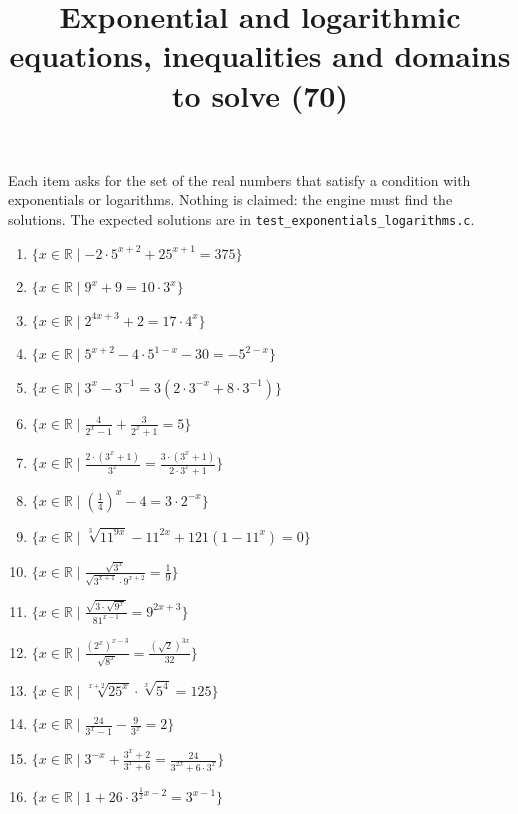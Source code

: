 \documentclass[11pt,a4paper]{article}
\title{Exponential and logarithmic equations, inequalities and domains to solve (70)}
\author{}
\date{}
\begin{document}
\maketitle
Each item asks for the set of the real numbers that satisfy a condition with exponentials or logarithms. Nothing is claimed: the engine must find the solutions. The expected solutions are in \texttt{test\_exponentials\_logarithms.c}.

\begin{enumerate}
\item $\displaystyle \{x \in \mathbb{R} \mid -2 \cdot 5^{x+2} + 25^{x+1} = 375\}$
\item $\displaystyle \{x \in \mathbb{R} \mid 9^{x} + 9 = 10 \cdot 3^{x}\}$
\item $\displaystyle \{x \in \mathbb{R} \mid 2^{4x+3} + 2 = 17 \cdot 4^{x}\}$
\item $\displaystyle \{x \in \mathbb{R} \mid 5^{x+2} - 4 \cdot 5^{1-x} - 30 = -5^{2-x}\}$
\item $\displaystyle \{x \in \mathbb{R} \mid 3^{x} - 3^{-1} = 3(2 \cdot 3^{-x} + 8 \cdot 3^{-1})\}$
\item $\displaystyle \{x \in \mathbb{R} \mid \frac{4}{2^{x} - 1} + \frac{3}{2^{x} + 1} = 5\}$
\item $\displaystyle \{x \in \mathbb{R} \mid \frac{2 \cdot (3^{x} + 1)}{3^{x}} = \frac{3 \cdot (3^{x} + 1)}{2 \cdot 3^{x} + 1}\}$
\item $\displaystyle \{x \in \mathbb{R} \mid \left(\frac{1}{4}\right)^{x} - 4 = 3 \cdot 2^{-x}\}$
\item $\displaystyle \{x \in \mathbb{R} \mid \sqrt[3]{11^{9x}} - 11^{2x} + 121(1 - 11^{x}) = 0\}$
\item $\displaystyle \{x \in \mathbb{R} \mid \frac{\sqrt{3^{x}}}{\sqrt{3^{x+1}} \cdot 9^{x+2}} = \frac{1}{9}\}$
\item $\displaystyle \{x \in \mathbb{R} \mid \frac{\sqrt{3 \cdot \sqrt{9^{x}}}}{81^{x-1}} = 9^{2x+3}\}$
\item $\displaystyle \{x \in \mathbb{R} \mid \frac{(2^{x})^{x-3}}{\sqrt{8^{x}}} = \frac{(\sqrt{2})^{3x}}{32}\}$
\item $\displaystyle \{x \in \mathbb{R} \mid \sqrt[x+2]{25^{x}} \cdot \sqrt[x]{5^{4}} = 125\}$
\item $\displaystyle \{x \in \mathbb{R} \mid \frac{24}{3^{x} - 1} - \frac{9}{3^{x}} = 2\}$
\item $\displaystyle \{x \in \mathbb{R} \mid 3^{-x} + \frac{3^{x} + 2}{3^{x} + 6} = \frac{24}{3^{2x} + 6 \cdot 3^{x}}\}$
\item $\displaystyle \{x \in \mathbb{R} \mid 1 + 26 \cdot 3^{\frac{1}{2}x - 2} = 3^{x-1}\}$

\end{enumerate}
\end{document}
